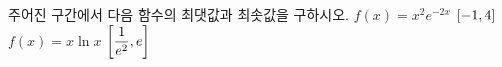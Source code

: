 주어진 구간에서 다음 함수의 최댓값과 최솟값을 구하시오.
 $f(x)=x^2e^{-2x}$ $[-1{,}\mkern3mu\mathopen{}4]$
 $f(x)=x\ln x$ $\left[\dfrac{1}{e^2}{,}\mkern3mu\mathopen{}e\right]$
